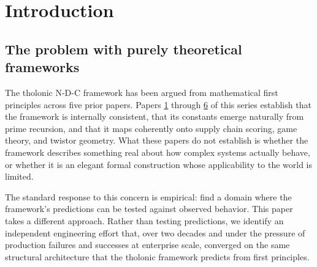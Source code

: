 \documentclass[12pt]{article}
\begin{document}
\begin{abstract}
Cambridge Semantics discovered these structural facts without any
knowledge of the tholonic framework. The convergence is therefore not an
analogy constructed after the fact. It is an independent rediscovery of
the same underlying structure by practitioners engineering toward a goal
they could not formally name.

We further show that the relationship is bidirectional: Cambridge
Semantics' empirical methodology provides the tholonic model with a
construction sequence (bottom-up ontology lifecycle), a philosophy of
provisional N states, and a proof-of-concept implementation architecture
(Cognee, as of May 2026). The paper concludes with a summary table of
open gaps in both systems and a statement of the most important
remaining formal problem: recursive SPARQL-based tholonic chain
traversal at the entity level.
\end{abstract}

\section{Introduction}\label{introduction}

\subsection{The problem with purely theoretical frameworks}\label{the-problem-with-purely-theoretical-frameworks}

The tholonic N-D-C framework has been argued from mathematical first
principles across five prior papers. Papers
\href{https://github.com/baardev/truevalue/blob/main/docnav/Research/papers/1_recursive-tholonic-five-constants/1_recursive-tholonic-five-constants.pdf}{1}
through
\href{https://github.com/baardev/truevalue/blob/main/docnav/Research/papers/6_qualitative-nature-integers-triadic-roles/6_qualitative-nature-integers-triadic-roles.pdf}{6}
of this series establish that the framework is internally consistent,
that its constants emerge naturally from prime recursion, and that it
maps coherently onto supply chain scoring, game theory, and twistor
geometry. What these papers do not establish is whether the framework
describes something real about how complex systems actually behave, or
whether it is an elegant formal construction whose applicability to the
world is limited.

The standard response to this concern is empirical: find a domain where
the framework's predictions can be tested against observed behavior.
This paper takes a different approach. Rather than testing predictions,
we identify an independent engineering effort that, over two decades and
under the pressure of production failures and successes at enterprise
scale, converged on the same structural architecture that the tholonic
framework predicts from first principles.
\end{document}
